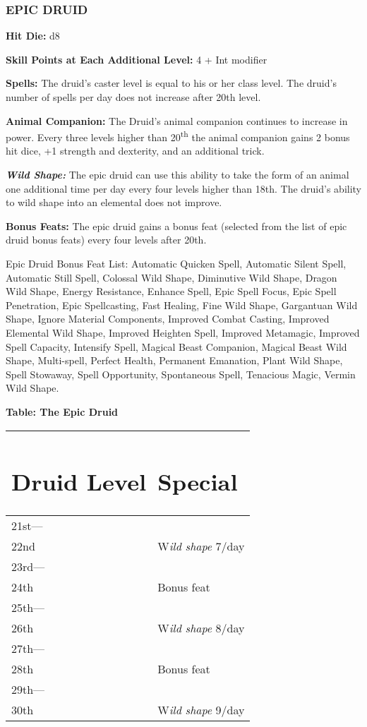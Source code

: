 \documentclass{article}
\begin{document}
\vspace{24pt}
\subsubsection*{{\LARGE{}EPIC DRUID }}

\textbf{Hit Die:} d8

\textbf{Skill Points at Each Additional Level:} 4 + Int modifier

\textbf{Spells:} The druid's caster level is equal to his or her class level. The 
druid's number of spells per day does not increase after 20th level. 

\textbf{Animal Companion: }The Druid's animal companion continues to increase in 
power.  Every three levels higher than 20\textsuperscript{th} the animal companion 
gains 2 bonus hit dice, +1 strength and dexterity, and an additional trick. 

\textit{\textbf{Wild Shape:}}\textit{ }The epic druid can use this ability to take 
the form of an animal one additional time per day every four levels higher than 
18th.  The druid's ability to wild shape into an elemental does not improve.

\textbf{Bonus Feats:} The epic druid gains a bonus feat (selected from the list 
of epic druid bonus feats) every four levels after 20th. 

Epic Druid Bonus Feat List: Automatic Quicken Spell, Automatic Silent Spell, Automatic 
Still Spell, Colossal Wild Shape, Diminutive Wild Shape, Dragon Wild Shape, Energy 
Resistance, Enhance Spell, Epic Spell Focus, Epic Spell Penetration, Epic Spellcasting, 
Fast Healing, Fine Wild Shape, Gargantuan Wild Shape, Ignore Material Components, 
Improved Combat Casting, Improved Elemental Wild Shape, Improved Heighten Spell, 
Improved Metamagic, Improved Spell Capacity, Intensify Spell, Magical Beast Companion, 
Magical Beast Wild Shape, Multi-spell, Perfect Health, Permanent Emanation, Plant 
Wild Shape, Spell Stowaway, Spell Opportunity, Spontaneous Spell, Tenacious Magic, 
Vermin Wild Shape. 

\textbf{Table: The Epic Druid }

\begin{tabular}{|>{\raggedright}p{29pt}|>{\raggedright}p{86pt}|}
\hline
\section*{D\textbf{ruid Level}} & \section*{S\textbf{pecial }}\tabularnewline
\hline
21st--- &  \tabularnewline
\hline
22nd & W\textit{ild shape }7/day \tabularnewline
\hline
23rd--- &  \tabularnewline
\hline
24th & Bonus feat \tabularnewline
\hline
25th--- &  \tabularnewline
\hline
26th & W\textit{ild shape }8/day \tabularnewline
\hline
27th--- &  \tabularnewline
\hline
28th & Bonus feat \tabularnewline
\hline
29th--- &  \tabularnewline
\hline
30th & W\textit{ild shape }9/day\tabularnewline
\hline
\end{tabular}
\end{document}
